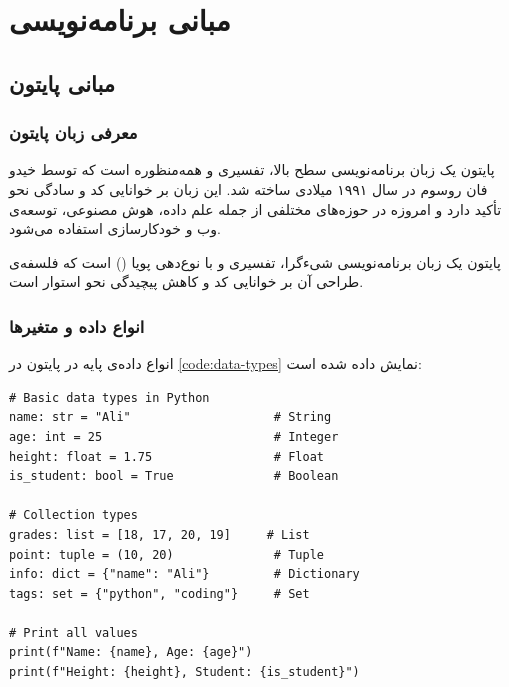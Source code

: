 \documentclass{matinbook}
\begin{document}
\part{مبانی برنامه‌نویسی}

\chapter{مبانی پایتون}
\label{chap:python}

\section{معرفی زبان پایتون}
\label{sec:python-intro}

پایتون یک زبان برنامه‌نویسی سطح بالا،
تفسیری و همه‌منظوره است که توسط خیدو فان
روسوم در سال ۱۹۹۱ میلادی
ساخته شد. این زبان بر خوانایی کد و سادگی نحو تأکید
دارد و امروزه در حوزه‌های مختلفی از جمله علم
داده، هوش مصنوعی،
توسعه‌ی وب و خودکارسازی
استفاده می‌شود.


\begin{definition}[پایتون]
    پایتون یک زبان برنامه‌نویسی شیءگرا، تفسیری و با
    نوع‌دهی پویا () است که فلسفه‌ی
    طراحی آن بر خوانایی کد و کاهش پیچیدگی نحو استوار
    است.
    \label{def:python}
\end{definition}

\section{انواع داده و متغیرها}
\label{sec:python-datatypes}

انواع داده‌ی پایه در پایتون در \cref{code:data-types}
نمایش داده شده است:

\begin{latin}
\begin{verbatim}
# Basic data types in Python
name: str = "Ali"                    # String
age: int = 25                        # Integer
height: float = 1.75                 # Float
is_student: bool = True              # Boolean

# Collection types
grades: list = [18, 17, 20, 19]     # List
point: tuple = (10, 20)              # Tuple
info: dict = {"name": "Ali"}         # Dictionary
tags: set = {"python", "coding"}     # Set

# Print all values
print(f"Name: {name}, Age: {age}")
print(f"Height: {height}, Student: {is_student}")
\end{verbatim}
\end{latin}
\label{code:data-types}
\end{document}
